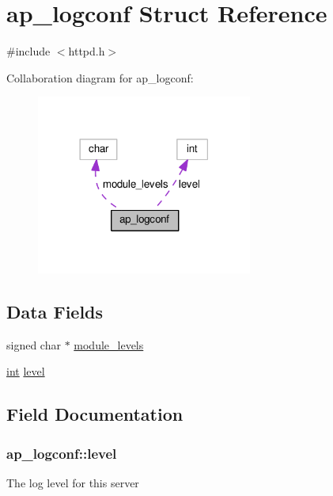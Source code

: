 \hypertarget{structap__logconf}{}\section{ap\+\_\+logconf Struct Reference}
\label{structap__logconf}


{\ttfamily \#include $<$httpd.\+h$>$}



Collaboration diagram for ap\+\_\+logconf\+:
\nopagebreak
\begin{figure}[H]
\begin{center}
\leavevmode
\includegraphics[width=201pt]{structap__logconf__coll__graph}
\end{center}
\end{figure}
\subsection*{Data Fields}
\begin{DoxyCompactItemize}
\item 
signed char $\ast$ \hyperlink{structap__logconf_a8da0bb36661c82630be8d2269593b8f0}{module\+\_\+levels}
\item 
\hyperlink{pcre_8txt_a42dfa4ff673c82d8efe7144098fbc198}{int} \hyperlink{structap__logconf_abf1e111fb331018de77fde6b428fe16f}{level}
\end{DoxyCompactItemize}


\subsection{Field Documentation}
\subsubsection[{\texorpdfstring{level}{level}}]{ ap\+\_\+logconf\+::level}\hypertarget{structap__logconf_abf1e111fb331018de77fde6b428fe16f}{}\label{structap__logconf_abf1e111fb331018de77fde6b428fe16f}
The log level for this server 
